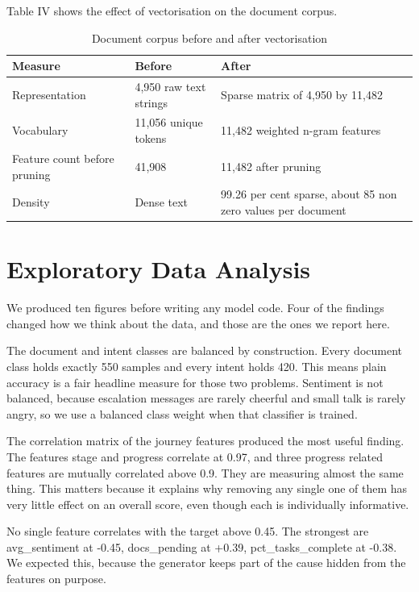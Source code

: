 \documentclass[conference]{IEEEtran}
\begin{document}
Table IV shows the effect of vectorisation on the document corpus.

\begin{table}[!t]
\centering
\caption{Document corpus before and after vectorisation}
\footnotesize
\setlength{\tabcolsep}{3pt}
\begin{tabular}{p{}p{}p{}}
\toprule
\textbf{Measure} & \textbf{Before} & \textbf{After} \\
\midrule
Representation & 4,950 raw text strings & Sparse matrix of 4,950 by 11,482 \\
Vocabulary & 11,056 unique tokens & 11,482 weighted n-gram features \\
Feature count before pruning & 41,908 & 11,482 after pruning \\
Density & Dense text & 99.26 per cent sparse, about 85 non zero values per document \\
\bottomrule
\end{tabular}
\end{table}

\section{Exploratory Data Analysis}
We produced ten figures before writing any model code. Four of the findings changed how we think about the data, and those are the ones we report here.

The document and intent classes are balanced by construction. Every document class holds exactly 550 samples and every intent holds 420. This means plain accuracy is a fair headline measure for those two problems. Sentiment is not balanced, because escalation messages are rarely cheerful and small talk is rarely angry, so we use a balanced class weight when that classifier is trained.

The correlation matrix of the journey features produced the most useful finding. The features stage and progress correlate at 0.97, and three progress related features are mutually correlated above 0.9. They are measuring almost the same thing. This matters because it explains why removing any single one of them has very little effect on an overall score, even though each is individually informative.

No single feature correlates with the target above 0.45. The strongest are avg\_sentiment at -0.45, docs\_pending at +0.39, pct\_tasks\_complete at -0.38. We expected this, because the generator keeps part of the cause hidden from the features on purpose.
\end{document}
